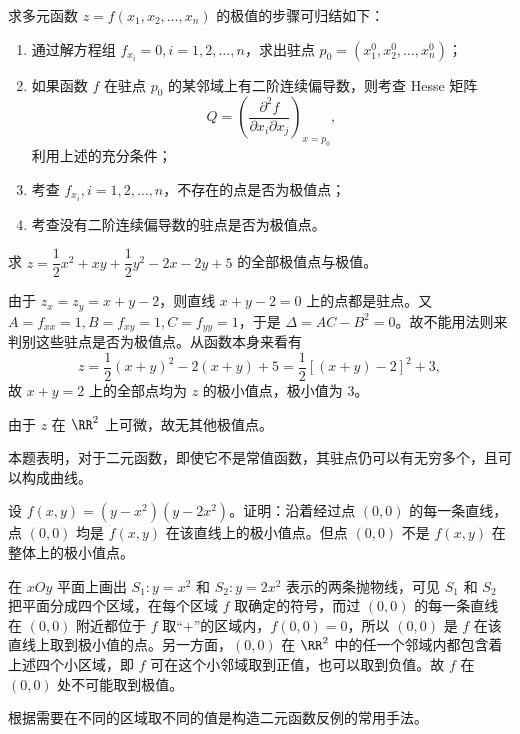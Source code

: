 求多元函数 $z=f(x_1,x_2,\ldots,x_n)$ 的极值的步骤可归结如下：
\begin{enumerate}[label=\arabic*.]
  \item 通过解方程组 $f_{x_i}=0,i=1,2,\ldots,n$，求出驻点 $p_0=(x_1^0,x_2^0,\ldots,x_n^0)$；
  \item 如果函数 $f$ 在驻点 $p_0$ 的某邻域上有二阶连续偏导数，则考查 Hesse 矩阵
  \[
    Q=\left(\frac{\partial^2f}{\partial x_i\partial x_j}\right)_{x=p_0},
  \]
  利用上述的充分条件；
  \item 考查 $f_{x_i},i=1,2,\ldots,n$，不存在的点是否为极值点；
  \item 考查没有二阶连续偏导数的驻点是否为极值点。
\end{enumerate}

\begin{xexample}[21.3.5]
求 $z=\dfrac12x^2+xy+\dfrac12y^2-2x-2y+5$ 的全部极值点与极值。
\end{xexample}
\begin{xsolution}
由于 $z_x=z_y=x+y-2$，则直线 $x+y-2=0$ 上的点都是驻点。又 $A=f_{xx}=1,B=f_{xy}=1,C=f_{yy}=1$，于是 $\Delta=AC-B^2=0$。故不能用法则来判别这些驻点是否为极值点。从函数本身来看有
\[
  z=\frac12(x+y)^2-2(x+y)+5=\frac12[(x+y)-2]^2+3,
\]
故 $x+y=2$ 上的全部点均为 $z$ 的极小值点，极小值为 $3$。

由于 $z$ 在 $\RR^2$ 上可微，故无其他极值点。
\end{xsolution}
\begin{xremark}
本题表明，对于二元函数，即使它不是常值函数，其驻点仍可以有无穷多个，且可以构成曲线。
\end{xremark}

\begin{xexample}[21.3.6]
设 $f(x,y)=(y-x^2)(y-2x^2)$。证明：沿着经过点 $(0,0)$ 的每一条直线，点 $(0,0)$ 均是 $f(x,y)$ 在该直线上的极小值点。但点 $(0,0)$ 不是 $f(x,y)$ 在整体上的极小值点。
\end{xexample}
\begin{xproof}
在 $xOy$ 平面上画出 $S_1:y=x^2$ 和 $S_2:y=2x^2$ 表示的两条抛物线，可见 $S_1$ 和 $S_2$ 把平面分成四个区域，在每个区域 $f$ 取确定的符号，而过 $(0,0)$ 的每一条直线在 $(0,0)$ 附近都位于 $f$ 取“$+$”的区域内，$f(0,0)=0$，所以 $(0,0)$ 是 $f$ 在该直线上取到极小值的点。另一方面，$(0,0)$ 在 $\RR^2$ 中的任一个邻域内都包含着上述四个小区域，即 $f$ 可在这个小邻域取到正值，也可以取到负值。故 $f$ 在 $(0,0)$ 处不可能取到极值。
\end{xproof}
\begin{xremark}
根据需要在不同的区域取不同的值是构造二元函数反例的常用手法。
\end{xremark}

